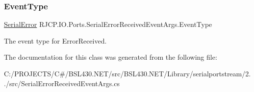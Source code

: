 \subsubsection{\texorpdfstring{EventType}{EventType}}
{\footnotesize\ttfamily \mbox{\hyperlink{namespace_r_j_c_p_1_1_i_o_1_1_ports_a117eef0f83d73b56ed3f13d084902e98}{Serial\+Error}} R\+J\+C\+P.\+I\+O.\+Ports.\+Serial\+Error\+Received\+Event\+Args.\+Event\+Type\hspace{0.3cm}{\ttfamily [get]}}



The event type for Error\+Received. 



The documentation for this class was generated from the following file\+:\begin{DoxyCompactItemize}
\item 
C\+:/\+P\+R\+O\+J\+E\+C\+T\+S/\+C\#/\+B\+S\+L430.\+N\+E\+T/src/\+B\+S\+L430.\+N\+E\+T/\+Library/serialportstream/2../src/Serial\+Error\+Received\+Event\+Args.\+cs\end{DoxyCompactItemize}
